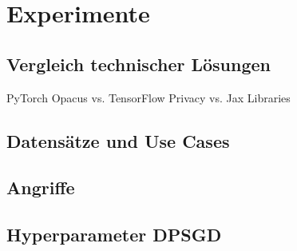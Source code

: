 \chapter{Experimente}\label{ch:experiments}

\section{Vergleich technischer Lösungen}
PyTorch Opacus vs. TensorFlow Privacy vs. Jax Libraries

\section{Datensätze und Use Cases}

\section{Angriffe}\label{sec:exp_angriffe}

\section{Hyperparameter DPSGD}